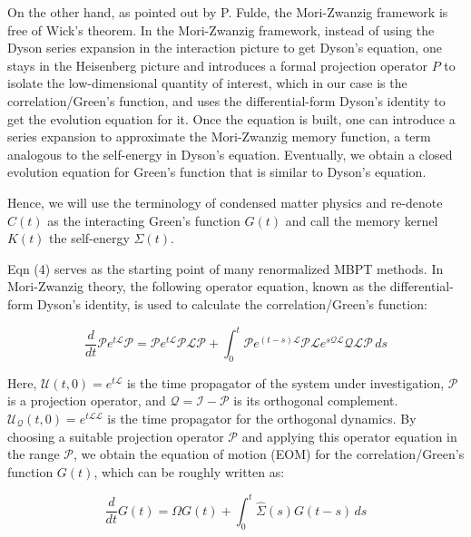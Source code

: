 \documentclass[12pt]{article}
\begin{document}
On the other hand, as pointed out by P. Fulde, the Mori-Zwanzig framework is free of Wick’s theorem. In the Mori-Zwanzig framework, instead of using the Dyson series expansion in the interaction picture to get Dyson’s equation, one stays in the Heisenberg picture and introduces a formal projection operator \( P \) to isolate the low-dimensional quantity of interest, which in our case is the correlation/Green’s function, and uses the differential-form Dyson’s identity to get the evolution equation for it. Once the equation is built, one can introduce a series expansion to approximate the Mori-Zwanzig memory function, a term analogous to the self-energy in Dyson’s equation. Eventually, we obtain a closed evolution equation for Green’s function that is similar to Dyson’s equation.

Hence, we will use the terminology of condensed matter physics and re-denote \( C(t) \) as the interacting Green’s function \( G(t) \) and call the memory kernel \( K(t) \) the self-energy \( \Sigma(t) \).


Eqn (4) serves as the starting point of many renormalized MBPT methods. In Mori-Zwanzig theory, the following operator equation, known as the differential-form Dyson's identity, is used to calculate the correlation/Green's function:

\begin{equation}
\frac{d}{d t} \mathcal{P} e^{t \mathcal{L}} \mathcal{P}=\mathcal{P} e^{t \mathcal{L}} \mathcal{P} \mathcal{L} \mathcal{P}+\int_0^t \mathcal{P} e^{(t-s) \mathcal{L}} \mathcal{P} \mathcal{L} e^{s \mathcal{Q} \mathcal{L}} \mathcal{Q L} \mathcal{P} \, ds
\end{equation}

Here, \( \mathcal{U}(t, 0)=e^{t \mathcal{L}} \) is the time propagator of the system under investigation, \( \mathcal{P} \) is a projection operator, and \( \mathcal{Q}=\mathcal{I}-\mathcal{P} \) is its orthogonal complement. \( \mathcal{U}_{\mathcal{Q}}(t, 0)=e^{t \mathcal{L} \mathcal{L}} \) is the time propagator for the orthogonal dynamics. By choosing a suitable projection operator \( \mathcal{P} \) and applying this operator equation in the range \( \mathcal{P} \), we obtain the equation of motion (EOM) for the correlation/Green's function \( G(t) \), which can be roughly written as:

\begin{equation}
\frac{d}{d t} G(t)=\Omega G(t)+\int_0^t \hat{\Sigma}(s) G(t-s) \, ds
\end{equation}
\end{document}

